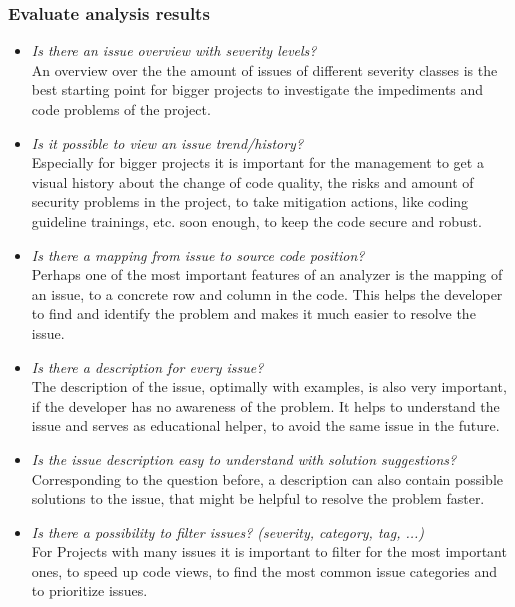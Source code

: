 \documentclass[conference]{IEEEtran}
\begin{document}
\subsubsection{Evaluate analysis results}
\label{subsubsec:evaluation_results}
\begin{itemize}
	\item \textit{Is there an issue overview with severity levels?} \\
	An overview over the the amount of issues of different severity classes is the best starting point for bigger projects to investigate the impediments and code problems of the project.
	
	\item \textit{Is it possible to view an issue trend/history?} \\
	Especially for bigger projects it is important for the management to get a visual history about the change of code quality, the risks and amount of security problems in the project, to take mitigation actions, like coding guideline trainings, etc. soon enough, to keep the code secure and robust.	
	
	\item \textit{Is there a mapping from issue to source code position?} \\
	Perhaps one of the most important features of an analyzer is the mapping of an issue, to a concrete row and column in the code.
	This helps the developer to find and identify the problem and makes it much easier to resolve the issue.
	
	\item \textit{Is there a description for every issue?} \\
	The description of the issue, optimally with examples, is also very important, if the developer has no awareness of the problem.
	It helps to understand the issue and serves as educational helper, to avoid the same issue in the future.
	
	\item \textit{Is the issue description easy to understand with solution suggestions?} \\
	Corresponding to the question before, a description can also contain possible solutions to the issue, that might be helpful to resolve the problem faster.
	
	\item \textit{Is there a possibility to filter issues? (severity, category, tag, ...)} \\
	For Projects with many issues it is important to filter for the most important ones, to speed up code views, to find the most common issue categories and to prioritize issues.
\end{itemize}
\end{document}

